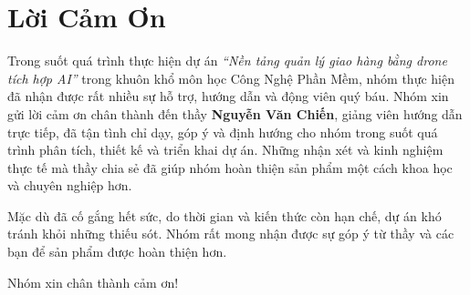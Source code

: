 \chapter*{Lời Cảm Ơn}

Trong suốt quá trình thực hiện dự án \textit{``Nền tảng quản lý giao hàng bằng drone tích hợp AI''} trong khuôn khổ môn học Công Nghệ Phần Mềm, nhóm thực hiện đã nhận được rất nhiều sự hỗ trợ, hướng dẫn và động viên quý báu. Nhóm xin gửi lời cảm ơn chân thành đến thầy \textbf{Nguyễn Văn Chiến}, giảng viên hướng dẫn trực tiếp, đã tận tình chỉ dạy, góp ý và định hướng cho nhóm trong suốt quá trình phân tích, thiết kế và triển khai dự án. Những nhận xét và kinh nghiệm thực tế mà thầy chia sẻ đã giúp nhóm hoàn thiện sản phẩm một cách khoa học và chuyên nghiệp hơn.

Mặc dù đã cố gắng hết sức, do thời gian và kiến thức còn hạn chế, dự án khó tránh khỏi những thiếu sót. Nhóm rất mong nhận được sự góp ý từ thầy và các bạn để sản phẩm được hoàn thiện hơn.

\vspace{1em}
\noindent Nhóm xin chân thành cảm ơn!


